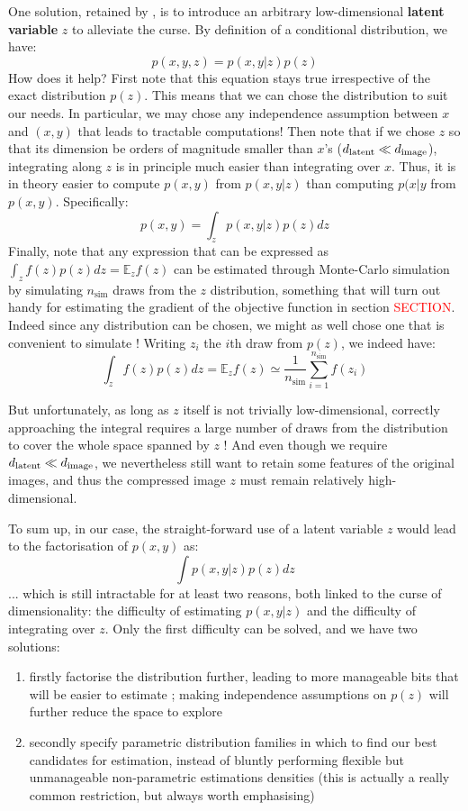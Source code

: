 \documentclass{article}
\begin{document}
\begin{appendix}
One solution, retained by \citet{zeroshot}, is to introduce an arbitrary low-dimensional \textbf{latent variable} $z$ to alleviate the curse. By definition of a conditional distribution, we have:
$$p(x,y,z)=p(x,y | z) p(z)$$
How does it help? First note that this equation stays true irrespective of the exact distribution $p(z)$. This means that we can chose the distribution to suit our needs. In particular, we may chose any independence assumption between $x$ and $(x,y)$ that leads to tractable computations! Then note that if we chose $z$ so that its dimension be orders of magnitude smaller than $x$'s (${d_{\mathrm{latent}}}\ll d_{\mathrm{image}}$), integrating along $z$ is in principle much easier than integrating over $x$. Thus, it is in theory easier to compute $p(x,y)$ from $p(x,y | z)$ than computing $p(x|y$ from $p(x,y)$. Specifically:
$$p(x,y)=\int_z p(x,y | z) p(z) dz$$
Finally, note that any expression that can be expressed as $\int_z f(z) p(z) dz=\mathbb{E}_z f(z)$ can be estimated through Monte-Carlo simulation by simulating $n_\text{sim}$ draws from the $z$ distribution, something that will turn out handy for estimating the gradient of the objective function in section \textcolor{red}{SECTION}. Indeed since any distribution can be chosen, we might as well chose one that is convenient to simulate ! Writing $z_i$ the $i$th draw from $p(z)$, we indeed have:
$$\int_z f(z) p(z) dz=\mathbb{E}_z f(z)\simeq \frac{1}{n_\text{sim}}\sum_{i=1}^{n_\text{sim}} f(z_i)$$

But unfortunately, as long as $z$ itself is not trivially low-dimensional, correctly approaching the integral requires a large number of draws from the distribution to cover the whole space spanned by $z$ ! And even though we require ${d_{\mathrm{latent}}}\ll d_{\mathrm{image}}$,  we nevertheless still want to retain some features of the original images, and thus the compressed image $z$ must remain relatively high-dimensional.

To sum up, in our case, the straight-forward use of a latent variable $z$ would lead to the factorisation of $p(x,y)$ as: $$\int p(x,y|z)p(z)dz$$ ... which is still intractable for at least two reasons, both linked to the curse of dimensionality: the difficulty of estimating $p(x,y|z)$ and the difficulty of integrating over $z$. Only the first difficulty can be solved, and we have two solutions:

\begin{enumerate}
    \item firstly factorise the distribution further, leading to more manageable bits that will be easier to estimate ; making independence assumptions on $p(z)$ will further reduce the space to explore
    \item secondly specify parametric distribution families in which to find our best candidates for estimation, instead of bluntly performing flexible but unmanageable non-parametric estimations densities (this is actually a really common restriction, but always worth emphasising)
\end{enumerate}


\end{appendix}
\end{document}
